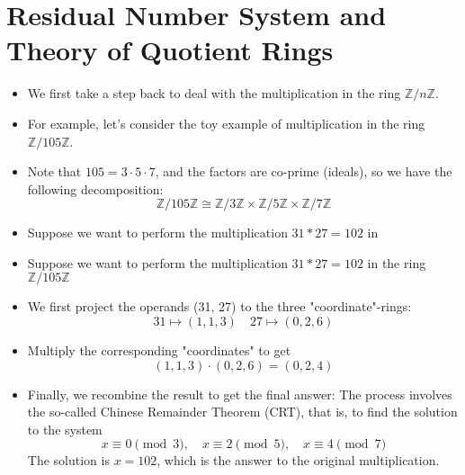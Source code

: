 \section{Residual Number System and Theory of Quotient Rings}

\begin{frame}
    \begin{itemize}
        \item <1->We first take a step back to deal with the multiplication in 
              the ring \(\mathbb{Z}/ n\mathbb{Z}\).
        \item <2->For example, let's consider the toy example of multiplication 
              in the ring \(\mathbb{Z}/ 105\mathbb{Z}\).
        \item <3->Note that \( 105 = 3 \cdot 5\cdot 7\), 
              and the factors are co-prime (ideals), 
              so we have the following decomposition:
              \[ \mathbb{Z}/ 105\mathbb{Z} \cong 
                 \mathbb{Z}/ 3\mathbb{Z} \times 
                 \mathbb{Z}/ 5\mathbb{Z} \times 
                 \mathbb{Z}/ 7\mathbb{Z} \]
        \item <4->Suppose we want to perform the multiplication \(31 * 27 = 102\) in 
        \item <5->Suppose we want to perform the multiplication \(31 * 27 = 102\) in 
              the ring \(\mathbb{Z}/ 105\mathbb{Z}\)
        \item <6->We first project the operands (31, 27) to the three "coordinate"-rings:
              \[ 31 \mapsto (1, 1, 3) \quad 27 \mapsto (0, 2, 6) \]
        \item <7->Multiply the corresponding "coordinates" to get
              \[ (1, 1, 3) \cdot (0, 2, 6) = (0, 2, 4) \]
        \item <8->Finally, we recombine the result to get the final answer:
              The process involves the so-called Chinese Remainder Theorem (CRT),
              that is, to find the solution to the system
              \[
                x \equiv 0 \pmod{3}, \quad
                x \equiv 2 \pmod{5}, \quad
                x \equiv 4 \pmod{7}
              \]
              The solution is \(x = 102\), 
              which is the answer to the original multiplication.
             

    \end{itemize}
\end{frame}


